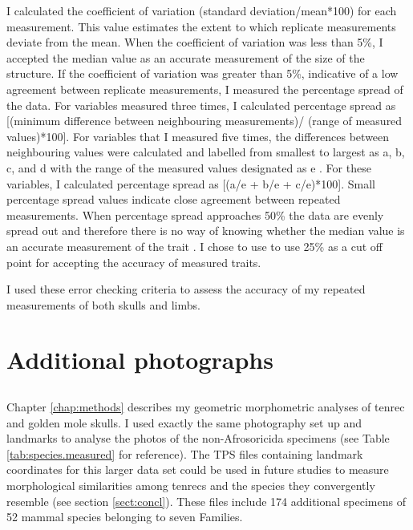 	I calculated the coefficient of variation (standard deviation/mean*100) for each measurement. This value estimates the extent to which replicate measurements deviate from the mean. When the coefficient of variation was less than 5\%, I accepted the median value as an accurate measurement of the size of the structure. 
	If the coefficient of variation was greater than 5\%, indicative of a low agreement between replicate measurements, I measured the percentage spread of the data. For variables measured three times, I calculated percentage spread as [(minimum difference between neighbouring measurements)/ (range of measured values)*100].
	For variables that I measured five times, the differences between neighbouring values were calculated and labelled from smallest to largest as a, b, c, and d with the range of the measured values designated as e \citep[for a full explanation see][]{Cooper2009}. For these variables, I calculated percentage spread as [(a/e + b/e + c/e)*100]. 
	Small percentage spread values indicate close agreement between repeated measurements. When percentage spread approaches 50\% the data are evenly spread out and therefore there is no way of knowing whether the median value is an accurate measurement of the trait \citep{Cooper2009}. I chose to use to use 25\% as a cut off point for accepting the accuracy of measured traits.

	I used these error checking criteria to assess the accuracy of my repeated measurements of both skulls and limbs. 

\section{Additional photographs}
	\subsection{}
	Chapter \ref{chap:methods} describes my geometric morphometric analyses of tenrec and golden mole skulls. I used exactly the same photography set up and landmarks to analyse the photos of the non-Afrosoricida specimens (see Table \ref{tab:species.measured} for reference). The TPS files containing landmark coordinates for this larger data set could be used in future studies to measure morphological similarities among tenrecs and the species they convergently resemble (see section \ref{sect:concl}). These files include 174 additional specimens of 52 mammal species belonging to seven Families.
		
